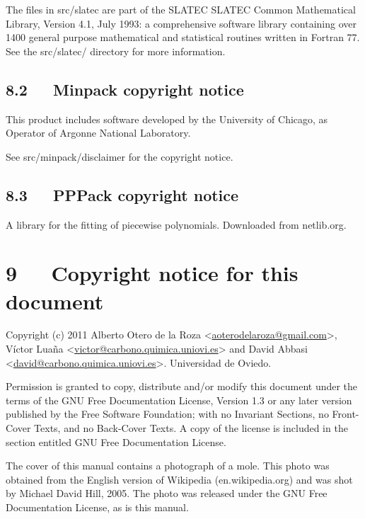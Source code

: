 \documentclass[a4paper]{article}
\begin{document}
The files in src/slatec are part of the SLATEC SLATEC Common
Mathematical Library, Version 4.1, July 1993:
a comprehensive software library containing over
1400 general purpose mathematical and statistical routines
written in Fortran 77. See the src/slatec/ directory for more
information.


\subsection{8.2~~~Minpack copyright notice%
  \label{minpack-copyright-notice}%
}

This product includes software developed by the
University of Chicago, as Operator of Argonne National
Laboratory.

See src/minpack/disclaimer for the copyright notice.


\subsection{8.3~~~PPPack copyright notice%
  \label{pppack-copyright-notice}%
}

A library for the fitting of piecewise polynomials. Downloaded from
netlib.org.


\section{9~~~Copyright notice for this document%
  \label{copyright-notice-for-this-document}%
}

Copyright (c) 2011 Alberto Otero de la Roza <\href{mailto:aoterodelaroza@gmail.com}{aoterodelaroza@gmail.com}>,
Víctor Luaña <\href{mailto:victor@carbono.quimica.uniovi.es}{victor@carbono.quimica.uniovi.es}> and David
Abbasi <\href{mailto:david@carbono.quimica.uniovi.es}{david@carbono.quimica.uniovi.es}>. Universidad de Oviedo.

Permission is granted to copy, distribute and/or modify this document
under the terms of the GNU Free Documentation License, Version 1.3 or
any later version published by the Free Software Foundation; with no
Invariant Sections, no Front-Cover Texts, and no Back-Cover Texts.  A
copy of the license is included in the section entitled \textquotedbl{}GNU Free
Documentation License\textquotedbl{}.

The cover of this manual contains a photograph of a mole. This
photo was obtained from the English version of Wikipedia
(en.wikipedia.org) and was shot by Michael David Hill, 2005. The photo
was released under the GNU Free Documentation License, as is this
manual.
\end{document}
